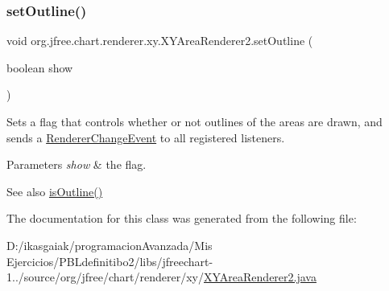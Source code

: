 \subsubsection{\texorpdfstring{set\+Outline()}{setOutline()}}
{\footnotesize\ttfamily void org.\+jfree.\+chart.\+renderer.\+xy.\+X\+Y\+Area\+Renderer2.\+set\+Outline (\begin{DoxyParamCaption}\item[{boolean}]{show }\end{DoxyParamCaption})}

Sets a flag that controls whether or not outlines of the areas are drawn, and sends a \mbox{\hyperlink{}{Renderer\+Change\+Event}} to all registered listeners.


\begin{DoxyParams}{Parameters}
{\em show} & the flag.\\
\hline
\end{DoxyParams}
\begin{DoxySeeAlso}{See also}
\mbox{\hyperlink{classorg_1_1jfree_1_1chart_1_1renderer_1_1xy_1_1_x_y_area_renderer2_ab5287c12f7f6aaf8f366abf749f9b4a3}{is\+Outline()}} 
\end{DoxySeeAlso}


The documentation for this class was generated from the following file\+:\begin{DoxyCompactItemize}
\item 
D\+:/ikasgaiak/programacion\+Avanzada/\+Mis Ejercicios/\+P\+B\+Ldefinitibo2/libs/jfreechart-\/1../source/org/jfree/chart/renderer/xy/\mbox{\hyperlink{_x_y_area_renderer2_8java}{X\+Y\+Area\+Renderer2.\+java}}\end{DoxyCompactItemize}
